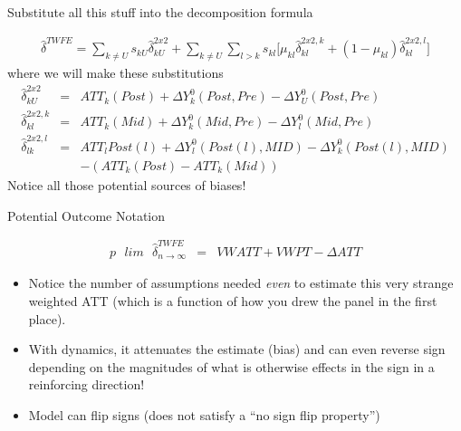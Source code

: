 \documentclass{beamer}
\begin{document}
\begin{frame}{Substitute all this stuff into the decomposition formula}

\begin{eqnarray*}	
\widehat{\delta}^{TWFE} = \sum_{k \neq U} s_{kU}\widehat{\delta}_{kU}^{2x2} + \sum_{k \neq U} \sum_{l>k} s_{kl}  \bigg [ \mu_{kl}\widehat{\delta}_{kl}^{2x2,k} + (1-\mu_{kl}) \widehat{\delta}_{kl}^{2x2,l} \bigg]
\end{eqnarray*}where we will make these substitutions\begin{eqnarray*}
\widehat{\delta}_{kU}^{2x2} &=& ATT_k(Post) + \Delta Y_k^0(Post,Pre) - \Delta Y_U^0(Post, Pre) \\
\widehat{\delta}_{kl}^{2x2,k} &=& ATT_k(Mid) + \Delta Y_k^0(Mid,Pre) - \Delta Y_l^0(Mid, Pre) \\
\widehat{\delta}^{2x2,l}_{lk} &=& ATT_{l}Post(l) + \Delta Y^0_l(Post(l),MID) - \Delta Y^0_k ( Post(l), MID) \\
&&- (ATT_k(Post) - ATT_k(Mid))
\end{eqnarray*}Notice all those potential sources of biases! 

\end{frame}


\begin{frame}{Potential Outcome Notation}

\begin{eqnarray*}
p\text{ }lim\text{ } \widehat{\delta}^{TWFE}_{n\to\infty} &=& VWATT + VWPT - \Delta ATT
\end{eqnarray*}

\begin{itemize}
\item Notice the number of assumptions needed \emph{even} to estimate this very strange weighted ATT (which is a function of how you drew the panel in the first place). 
\item With dynamics, it attenuates the estimate (bias) and can even reverse sign depending on the magnitudes of what is otherwise effects in the sign in a reinforcing direction! 
\item Model can flip signs (does not satisfy a ``no sign flip property'')
\end{itemize}

\end{frame}
\end{document}
